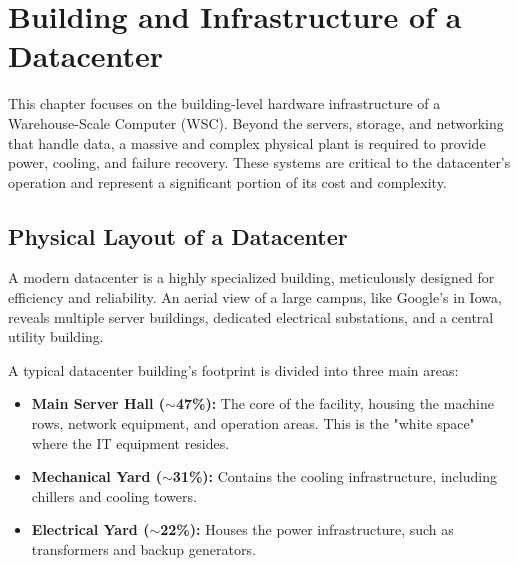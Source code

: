 \chapter{Building and Infrastructure of a Datacenter}

This chapter focuses on the building-level hardware infrastructure of a Warehouse-Scale Computer (WSC). Beyond the servers, storage, and networking that handle data, a massive and complex physical plant is required to provide power, cooling, and failure recovery. These systems are critical to the datacenter's operation and represent a significant portion of its cost and complexity.

\section{Physical Layout of a Datacenter}
A modern datacenter is a highly specialized building, meticulously designed for efficiency and reliability. An aerial view of a large campus, like Google's in Iowa, reveals multiple server buildings, dedicated electrical substations, and a central utility building.

A typical datacenter building's footprint is divided into three main areas:
\begin{itemize}
    \item \textbf{Main Server Hall ($\sim$47\%):} The core of the facility, housing the machine rows, network equipment, and operation areas. This is the "white space" where the IT equipment resides.
    \item \textbf{Mechanical Yard ($\sim$31\%):} Contains the cooling infrastructure, including chillers and cooling towers.
    \item \textbf{Electrical Yard ($\sim$22\%):} Houses the power infrastructure, such as transformers and backup generators.
\end{itemize}

